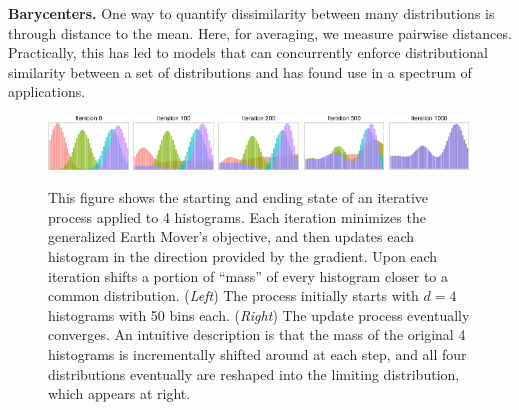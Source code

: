{\bf Barycenters.} 
One way to quantify dissimilarity between many distributions is through distance to the mean. Here, for averaging,  
we measure pairwise distances.
Practically, this has led to models that can 
concurrently enforce distributional similarity between a 
set of distributions and has found use in 
a spectrum of applications.

\begin{figure}[ht]
    \centering
    \includegraphics[width=0.19\textwidth]{chap5/hists/hists_iter_0.pdf}
    \includegraphics[width=0.19\textwidth]{chap5/hists/hists_iter_100.pdf}
    \includegraphics[width=0.19\textwidth]{chap5/hists/hists_iter_200.pdf}
    \includegraphics[width=0.19\textwidth]{chap5/hists/hists_iter_500.pdf}
    \includegraphics[width=0.19\textwidth]{chap5/hists/hists_iter_1000.pdf}
    \caption{This figure shows the starting and ending state of an iterative process applied to 4 histograms. Each iteration minimizes the generalized Earth Mover's objective, and then updates each histogram in the direction provided by the gradient. Upon each iteration shifts a portion of ``mass'' of every histogram closer to a common distribution. ({\em Left}) The process initially starts with $d=4$ histograms with 50 bins each. ({\em Right}) The update process eventually converges. An intuitive description is that the mass of the original 4 histograms is incrementally shifted around at each step, and all four distributions eventually are reshaped into the limiting distribution, which appears at right. }
    \label{fig:hists}
\end{figure}

